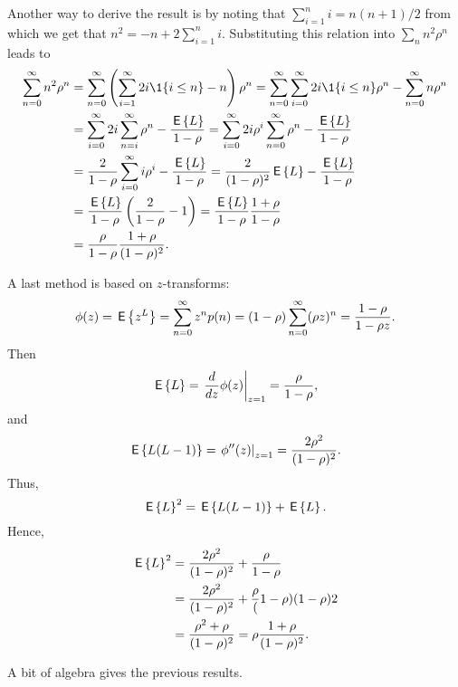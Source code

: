 \begin{question}
\begin{solution}
Another way to derive the result is by noting that
$\sum_{i=1}^n i= n(n+1)/2$ from which we get that
$n^2 = -n + 2\sum_{i=1}^n i$. Substituting this relation into
$\sum_n n^2 \rho^n$ leads to
\begin{equation*}
  \begin{split}
    \sum_{n=0}^\infty n^2 \rho^n 
&=    \sum_{n=0}^\infty \left(\sum_{i=1}^\infty 2i \1{i\leq n}  - n\right)\rho^n 
=    \sum_{n=0}^\infty \sum_{i=0}^\infty 2i\1{i\leq n}\rho^n  - \sum_{n=0}^\infty n\rho^n \\
&=    \sum_{i=0}^\infty 2i \sum_{n=i}^\infty \rho^n  - \frac{\E L}{1-\rho} 
=    \sum_{i=0}^\infty 2i \rho^i \sum_{n=0}^\infty \rho^n  - \frac{\E L}{1-\rho} \\
&=    \frac2{1-\rho} \sum_{i=0}^\infty i \rho^i   - \frac{\E L}{1-\rho} 
=    \frac2{(1-\rho)^2} \E L - \frac{\E L}{1-\rho} \\
&=    \frac{\E L}{1-\rho}  \left(\frac2{1-\rho}  - 1\right) 
=    \frac{\E L}{1-\rho}  \frac{1+\rho}{1-\rho} \\
&=    \frac{\rho}{1-\rho}  \frac{1+\rho}{(1-\rho)^2}.
\end{split}
\end{equation*}

A last method is based on $z$-transforms:
\begin{equation*}
  \phi(z) = \,\mathsf{E}\left\{z^L\right\} = \sum_{n=0}^\infty z^n p(n) = (1-\rho) \sum_{n=0}^\infty (\rho z)^n = \frac{1-\rho}{1-\rho z}.
\end{equation*}
Then 
\begin{equation*}
  \,\mathsf{E}\left\{L\right\} = \left.\frac d {dz} \phi(z)\right|_{z=1} = \frac{\rho}{1-\rho},
\end{equation*}
and 
\begin{equation*}
  \,\mathsf{E}\left\{L(L-1)\right\}= \left.\phi''(z)\right|_{z=1} = \frac{2\rho^2}{(1-\rho)^2}.
\end{equation*}
Thus,
\begin{equation*}
\,\mathsf{E}\left\{L\right\}^2 =   \,\mathsf{E}\left\{L(L-1)\right\} + \,\mathsf{E}\left\{L\right\}.
\end{equation*}
Hence,
\begin{equation*}
  \begin{split}
\,\mathsf{E}\left\{L\right\}^2 
&=   \frac{2\rho^2}{(1-\rho)^2} + \frac\rho{1-\rho} \\
&=   \frac{2\rho^2}{(1-\rho)^2} + \frac\rho(1-\rho){(1-\rho)2} \\
&=   \frac{\rho^2+\rho}{(1-\rho)^2} = \rho \frac{1+\rho}{(1-\rho)^2}.
  \end{split}
\end{equation*}

A bit of algebra gives the previous results.
  \end{solution}
\end{question}


